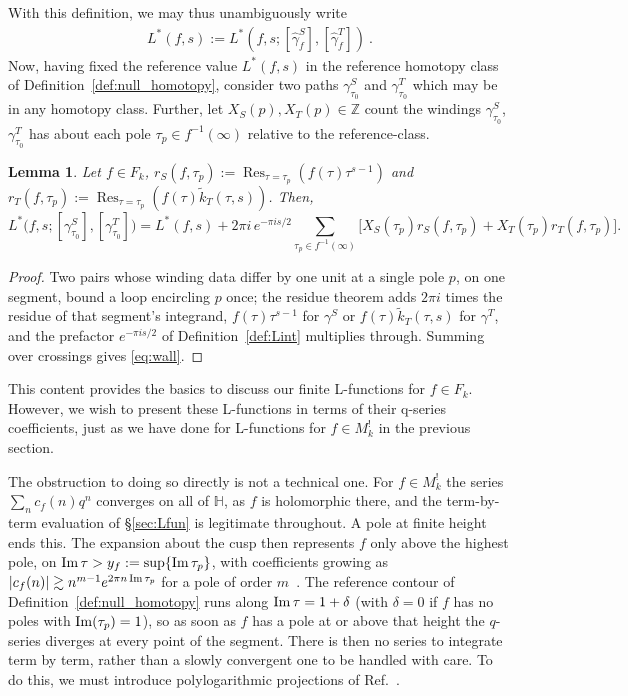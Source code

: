 \documentclass[11pt]{article}
\newtheorem{lemma}[theorem]{Lemma}
\newcommand{\HH}{\mathbb{H}}
\newcommand{\ZZ}{\mathbb{Z}}
\newcommand{\tk}{\widetilde{k}_T}
\DeclareMathOperator{\Res}{Res}
\begin{document}
With this definition, we may thus unambiguously write
\begin{align}
L^*(f,s) := L^*(f, s; [\hat\gamma_f^S], [\hat\gamma_f^T])~.
\end{align} 
Now, having fixed the reference value $L^*(f,s)$ in the reference
homotopy class of Definition~\ref{def:null_homotopy}, consider
two paths $\gamma^S_{\tau_0}$ and $\gamma^T_{\tau_0}$ which may 
be in any homotopy class. Further, let $X_S(p),X_T(p)\in\ZZ$ count 
the windings $\gamma^S_{\tau_0}$, $\gamma^T_{\tau_0}$
has about each pole $\tau_p\in f^{-1}(\infty)$ relative to the reference-class.

\begin{lemma}\label{lem:wall}
Let $f\in F_k$, $r_S(f, \tau_p) := \Res_{\tau=\tau_p} (f(\tau) \tau^{s-1})$ 
and $r_T(f, \tau_p) := \Res_{\tau=\tau_p} (f(\tau) \tk(\tau, s))$. Then, 
\begin{equation}\label{eq:wall}
L^*\big(f,s;[\gamma^S_{\tau_0}],[\gamma^T_{\tau_0}]\big)
= L^*(f,s)
+ 2\pi i\,e^{-\pi i s/2}\sum_{\tau_p\in f^{-1}(\infty)}\Big[
X_S(\tau_p) r_S(f, \tau_p)
+ X_T(\tau_p) r_T(f, \tau_p) \Big].
\end{equation}
\end{lemma}

\begin{proof}
Two pairs whose winding data differ by one unit at a single pole $p$, on one segment,
bound a loop encircling $p$ once; the residue theorem adds $2\pi i$ times the residue of
that segment's integrand, $f(\tau) \tau^{s-1}$ for $\gamma^S$ or $f(\tau)\tk(\tau, s)$ for $\gamma^T$,
and the prefactor $e^{-\pi i s/2}$ of Definition~\ref{def:Lint} multiplies through.
Summing over crossings gives \eqref{eq:wall}.
\end{proof}

This content provides the basics to discuss our finite L-functions for $f \in F_k$.
However, we wish to present these L-functions in terms of their q-series coefficients,
just as we have done for L-functions for $f \in M_k^!$ in the previous section.

The obstruction to doing so directly is not a technical one. For $f\in M_k^!$ the series
$\sum_n c_f(n)q^n$ converges on all of $\HH$, as $f$ is holomorphic there, and the term-by-term
evaluation of \S\ref{sec:Lfun} is legitimate throughout. A pole at finite height ends this. The
expansion about the cusp then represents $f$ only above the highest pole, on
${\rm Im}\,\tau>y_f:=\sup\{{\rm Im}\,\tau_p\}$, with coefficients growing as
$|c_f(n)|\gtrsim n^{m-1}e^{2\pi n\,{\rm Im}\,\tau_p}$ for a pole of order $m$~\cite{1806}. The
reference contour of Definition~\ref{def:null_homotopy} runs along ${\rm Im}\,\tau=1+\delta$ (with $\delta = 0$ if $f$ has no poles with ${\rm Im}(\tau_p)=1$), so as soon as
$f$ has a pole at or above that height the $q$-series diverges at every point of the segment. There
is then no series to integrate term by term, rather than a slowly convergent one to be handled with
care. To do this, we must introduce polylogarithmic projections of Ref.~\cite{1806}.
\end{document}
